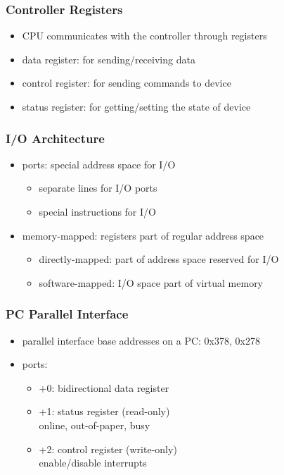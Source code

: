 \documentclass[dvipsnames]{beamer}
\begin{document}
\begin{frame}
  \frametitle{Controller Registers}

  \begin{itemize}
    \item CPU communicates with the controller through registers

    \medskip
    \item data register: for sending/receiving data
    \item control register: for sending commands to device
    \item status register: for getting/setting the state of device
  \end{itemize}
\end{frame}

\begin{frame}
  \frametitle{I/O Architecture}

  \begin{itemize}
    \item \alert{ports}: special address space for I/O
    \begin{itemize}
      \item separate lines for I/O ports
      \item special instructions for I/O
    \end{itemize}
  \end{itemize}

  \begin{itemize}
    \item \alert{memory-mapped}: registers part of regular address space
    \begin{itemize}
      \item directly-mapped: part of address space reserved for I/O
      \item software-mapped: I/O space part of virtual memory
    \end{itemize}
  \end{itemize}
\end{frame}

\begin{frame}
  \frametitle{PC Parallel Interface}

  \begin{itemize}
    \item parallel interface base addresses on a PC: 0x378, 0x278

    \medskip
    \item ports:
    \begin{itemize}
      \item +0: bidirectional data register
      \item +1: status register (read-only)\\
        online, out-of-paper, busy
      \item +2: control register (write-only)\\
        enable/disable interrupts
    \end{itemize}
  \end{itemize}
\end{frame}
\end{document}
